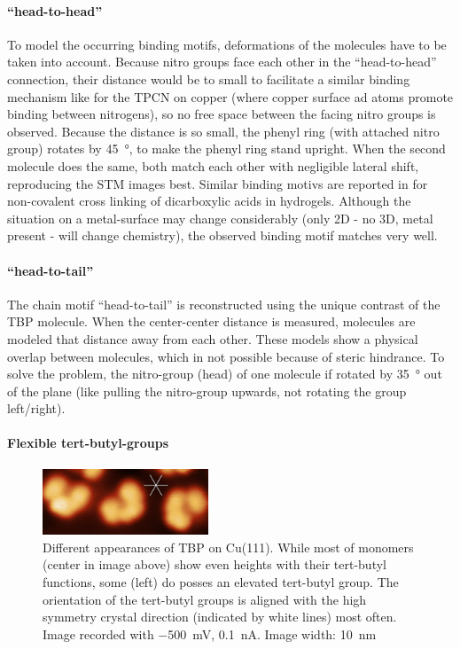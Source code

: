 \paragraph{``head-to-head''}
To model the occurring binding motifs, deformations of the molecules have to be taken into account. Because nitro groups face each other in the ``head-to-head'' connection, their distance would be to small to facilitate a similar binding mechanism like for the TPCN on copper (where copper surface ad atoms promote binding between nitrogens), so no free space between the facing nitro groups is observed. Because the distance is so small, the phenyl ring (with attached nitro group) rotates by \SI{45}{\degree}, to make the phenyl ring stand upright. When the second molecule does the same, both match each other with negligible lateral shift, reproducing the STM images best. Similar binding motivs are reported in \cite{kato_dispersive_2008} for non-covalent cross linking of dicarboxylic acids in hydrogels. Although the situation on a metal-surface may change considerably (only 2D - no 3D, metal present - will change chemistry), the observed binding motif matches very well.

\paragraph{``head-to-tail''}
The chain motif ``head-to-tail'' is reconstructed using the unique contrast of the TBP molecule. When the center-center distance is measured, molecules are modeled that distance away from each other. These models show a physical overlap between molecules, which in not possible because of steric hindrance. To solve the problem, the nitro-group (head) of one molecule if rotated by \SI{35}{\degree} out of the plane (like pulling the nitro-group upwards, not rotating the group left/right). 


\paragraph{Flexible tert-butyl-groups}
\begin{figure}\centering
	\includegraphics[width=0.44\textwidth]{./images/F151128-083339-10x4-overlay.png}
	\caption{Different appearances of TBP on Cu(111). While most of monomers (center in image above) show even heights with their tert-butyl functions, some (left) do posses an elevated tert-butyl group. The orientation of the tert-butyl groups is aligned with the high symmetry crystal direction (indicated by white lines) most often. Image recorded with  \SI{-500}{\milli\volt}, \SI{0.1}{\nano\ampere}. Image width: \SI{10}{\nano \meter}}
	\label{fig:TPB-butyl-flexibility-SMT}
\end{figure}

